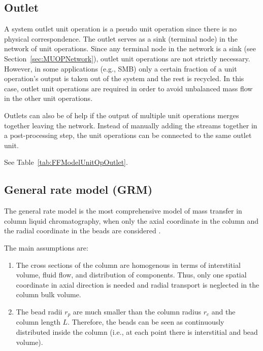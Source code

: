 \subsection{Outlet}\label{sec:MUOPOutlet}

A system outlet unit operation  is a pseudo unit operation since there is no physical correspondence.
The outlet serves as a sink (terminal node) in the network of unit operations.
Since any terminal node in the network is a sink (see Section~\ref{sec:MUOPNetwork}), outlet unit operations are not strictly necessary.
However, in some applications (e.g., SMB) only a certain fraction of a unit operation's output is taken out of the system and the rest is recycled.
In this case, outlet unit operations are required in order to avoid unbalanced mass flow in the other unit operations.

Outlets can also be of help if the output of multiple unit operations merges together leaving the network.
Instead of manually adding the streams together in a post-processing step, the unit operations can be connected to the same outlet unit.

See Table~\ref{tab:FFModelUnitOpOutlet}.

\subsection{General rate model (GRM)}\label{sec:MUOPGRM}

The general rate model  is the most comprehensive model of mass transfer in column liquid chromatography, when only the axial coordinate in the column and the radial coordinate in the beads are considered \cite{Kucera1965,Gu1995,Guiochon2006,Felinger2004}.

The main assumptions are:
\begin{enumerate}
	\item The cross sections of the column are homogenous in terms of interstitial volume, fluid flow, and distribution of components. Thus, only one spatial coordinate in axial direction is needed and radial transport is neglected in the column bulk volume.
	\item The bead radii $r_{p}$ are much smaller than the column radius $r_c$ and the column length $L$. Therefore, the beads can be seen as continuously distributed inside the column (i.e., at each point there is interstitial and bead volume).
\end{enumerate}

